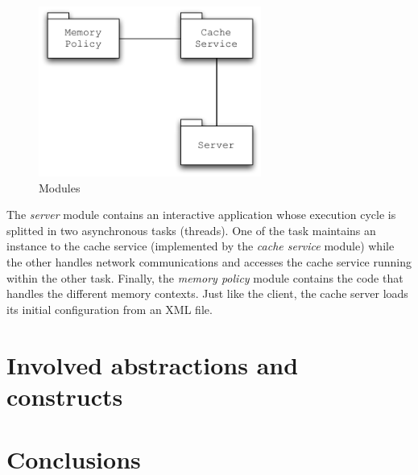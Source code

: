 \documentclass[11pt,a4paper]{article}
\begin{document}
\begin{figure}
\begin{center}
\includegraphics[width=0.65\textwidth]{figures/Server-Modules.pdf}
\caption{Modules}
\label{figure:server-modules}
\end{center}
\end{figure}

The \textit{server} module contains an interactive application whose execution cycle is splitted in two asynchronous tasks (threads). One of the task maintains an instance to the cache service (implemented by the \textit{cache service} module) while the other handles network communications and accesses the cache service running within the other task. Finally, the \textit{memory policy} module contains the code that handles the different memory contexts. Just like the client, the cache server loads its initial configuration from an XML file.

\section{Involved abstractions and constructs}
\label{section:functionalities}

\section{Conclusions}
\label{section:conclusions}
\end{document}
